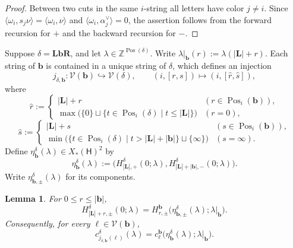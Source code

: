 \documentclass[10pt,a4paper]{article}
\newtheorem{lemma}[theorem]{Lemma}
\theoremstyle{definition}
\theoremstyle{remark}
\newcommand{\torusH}{\mathsf{H}}
\newcommand{\Vcal}{\mathcal V}
\begin{document}
\begin{proof}
Between two cuts in the same \(i\)-string all letters have color \(j\ne i\).
Since \(\langle\omega_i,s_j\nu\rangle=\langle\omega_i,\nu\rangle\) and
\(\langle\omega_i,\alpha_j^\vee\rangle=0\), the assertion follows from the
forward recursion for \(+\) and the backward recursion for \(-\).
\end{proof}

Suppose \(\delta=\mathbf L\mathbf b\mathbf R\), and let
\(\lambda\in\mathbb Z^{\operatorname{Pos}(\delta)}\).  Write
\(\lambda|_{\mathbf b}(r):=\lambda(|\mathbf L|+r)\).  Each string of
\(\mathbf b\) is contained in a unique string of \(\delta\), which defines an
injection
\[
 j_{\delta,\mathbf b}:\Vcal(\mathbf b)\hookrightarrow\Vcal(\delta),
 \qquad
 (i,[r,s])\longmapsto(i,[\hat r,\hat s]),
\]
where
\[
 \hat r:=
 \begin{cases}
  |\mathbf L|+r
   & (r\in\operatorname{Pos}_i(\mathbf b)),\\
  \max\bigl(\{0\}\sqcup
   \{t\in\operatorname{Pos}_i(\delta)\mid t\le|\mathbf L|\}\bigr)
   & (r=0),
 \end{cases}
\]
\[
 \hat s:=
 \begin{cases}
  |\mathbf L|+s
   & (s\in\operatorname{Pos}_i(\mathbf b)),\\
  \min\bigl(\{t\in\operatorname{Pos}_i(\delta)
   \mid t>|\mathbf L|+|\mathbf b|\}\sqcup\{\infty\}\bigr)
   & (s=\infty).
 \end{cases}
\]
Define
\(\eta_{\mathbf b}^{\delta}(\lambda)\in X_*(\torusH)^2\) by
\begin{equation}
 \eta_{\mathbf b}^{\delta}(\lambda)
 :=\bigl(H_{|\mathbf L|,+}^{\delta}(0;\lambda),
         H_{|\mathbf L|+|\mathbf b|,-}^{\delta}(0;\lambda)\bigr).
 \label{eq:cartan-subword-values}
\end{equation}
Write \(\eta_{\mathbf b,\pm}^{\delta}(\lambda)\) for its components.

\begin{lemma}
\label{lem:cartan-subword-restriction}
For \(0\le r\le|\mathbf b|\),
\begin{equation}
 H_{|\mathbf L|+r,\pm}^{\delta}(0;\lambda)
 =H_{r,\pm}^{\mathbf b}
   \bigl(\eta_{\mathbf b,\pm}^{\delta}(\lambda);
         \lambda|_{\mathbf b}\bigr).
 \label{eq:cartan-subword-restriction}
\end{equation}
Consequently, for every \(\ell\in\Vcal(\mathbf b)\),
\begin{equation}
 c_{j_{\delta,\mathbf b}(\ell)}^\delta(\lambda)
 =c_\ell^{\mathbf b}
   \bigl(\eta_{\mathbf b}^{\delta}(\lambda);
         \lambda|_{\mathbf b}\bigr).
 \label{eq:cartan-exponent-restriction}
\end{equation}
\end{lemma}
\end{document}
